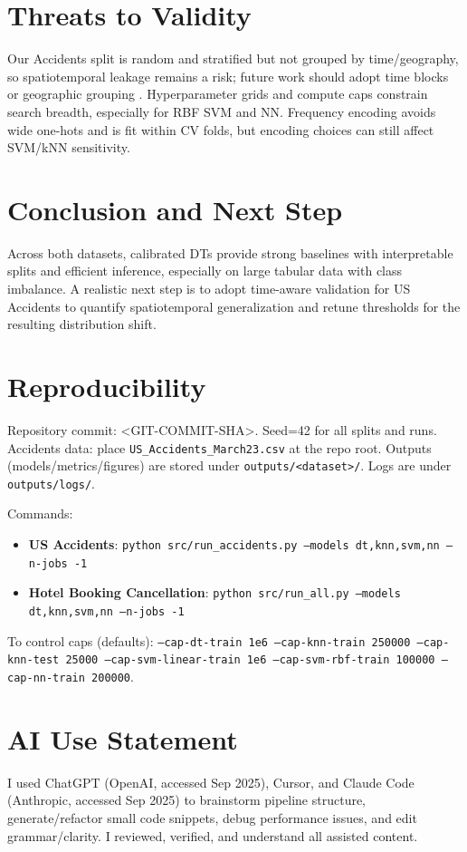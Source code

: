 \documentclass[conference]{IEEEtran}
\newcommand{\datasetA}{Hotel Booking Cancellation}
\newcommand{\datasetB}{US Accidents}
\newcommand{\commitsha}{<GIT-COMMIT-SHA>}
\newcommand{\seed}{42}
\begin{document}
\section{Threats to Validity}
Our Accidents split is random and stratified but not grouped by time/geography, so spatiotemporal leakage remains a risk; future work should adopt time blocks or geographic grouping \cite{Roberts2017BlockedCV}. Hyperparameter grids and compute caps constrain search breadth, especially for RBF SVM and NN. Frequency encoding avoids wide one-hots and is fit within CV folds, but encoding choices can still affect SVM/kNN sensitivity.

\section{Conclusion and Next Step}
Across both datasets, calibrated DTs provide strong baselines with interpretable splits and efficient inference, especially on large tabular data with class imbalance. A realistic next step is to adopt time-aware validation for \datasetB{} to quantify spatiotemporal generalization and retune thresholds for the resulting distribution shift.

\section*{Reproducibility}
Repository commit: \commitsha. Seed=\seed{} for all splits and runs. Accidents data: place \texttt{US\_Accidents\_March23.csv} at the repo root. Outputs (models/metrics/figures) are stored under \texttt{outputs/<dataset>/}. Logs are under \texttt{outputs/logs/}.

Commands:
\begin{itemize}
\item \textbf{\datasetB{}}: \texttt{python src/run\_accidents.py --models dt,knn,svm,nn --n-jobs -1}
\item \textbf{\datasetA{}}: \texttt{python src/run\_all.py --models dt,knn,svm,nn --n-jobs -1}
\end{itemize}
To control caps (defaults): \texttt{--cap-dt-train 1e6 --cap-knn-train 250000 --cap-knn-test 25000 --cap-svm-linear-train 1e6 --cap-svm-rbf-train 100000 --cap-nn-train 200000}.

\section*{AI Use Statement}
I used ChatGPT (OpenAI, accessed Sep 2025), Cursor, and Claude Code (Anthropic, accessed Sep 2025) to brainstorm pipeline structure, generate/refactor small code snippets, debug performance issues, and edit grammar/clarity. I reviewed, verified, and understand all assisted content.
\end{document}
